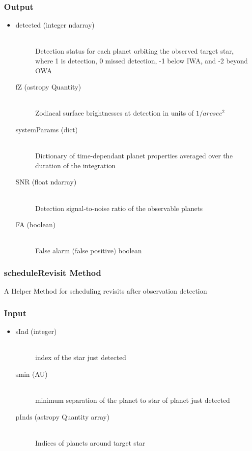 \documentclass[cleanfoot]{asme2ej}
\begin{document}
\subsubsection*{Output}
\begin{itemize}
\item 
\begin{description}
    \item[detected (integer ndarray)] \hfill \\ Detection status for each planet orbiting the observed target star, where 1 is detection, 0 missed detection, -1 below IWA, and -2 beyond OWA
    \item[fZ (astropy Quantity)] \hfill \\ Zodiacal surface brightnesses at detection in units of $1/arcsec^2$
    \item[systemParams (dict)] \hfill \\ Dictionary of time-dependant planet properties averaged over the duration of the integration
    \item[SNR (float ndarray)] \hfill \\ Detection signal-to-noise ratio of the observable planets
    \item[FA (boolean)] \hfill \\ False alarm (false positive) boolean
\end{description}
\end{itemize}

\subsubsection{scheduleRevisit Method} \label{sec:scheduleRevisittask}
A Helper Method for scheduling revisits after observation detection
\subsubsection*{Input}
\begin{itemize}
\item
\begin{description}
    \item[sInd (integer)] \hfill \\ index of the star just detected
    \item[smin (AU)] \hfill \\ minimum separation of the planet to star of planet just detected
    \item[pInds (astropy Quantity array)] \hfill \\ Indices of planets around target star
\end{description}
\end{itemize}
\end{document}
